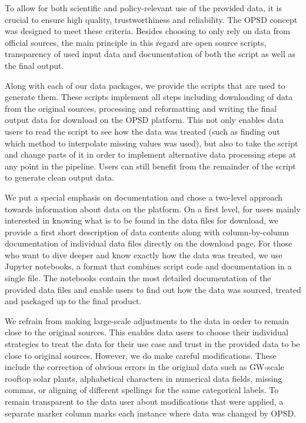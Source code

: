 \documentclass[article,sort&compress]{elsarticle}
\begin{document}
To allow for both scientific and policy-relevant use of the provided data, it is crucial to ensure high quality, trustworthiness and reliability. The OPSD concept was designed to meet these criteria. Besides choosing to only rely on data from official sources, the main principle in this regard are open source scripts, transparency of used input data and documentation of both the script as well as the final output.

Along with each of our data packages, we provide the scripts that are used to generate them. These scripts implement all steps including downloading of data from the original sources, processing and reformatting and writing the final output data for download on the OPSD platform. This not only enables data users to read the script to see how the data was treated (such as finding out which method to interpolate missing values was used), but also to take the script and change parts of it in order to implement alternative data processing steps at any point in the pipeline. Users can still benefit from the remainder of the script to generate clean output data.

We put a special emphasis on documentation and chose a two-level approach towards information about data on the platform. On a first level, for users mainly interested in knowing what is to be found in the data files for download, we provide a first short description of data contents along with column-by-column documentation of individual data files directly on the download page. For those who want to dive deeper and know exactly how the data was treated, we use Jupyter notebooks, a format that combines script code and documentation in a single file. The notebooks contain the most detailed documentation of the provided data files and enable users to find out how the data was sourced, treated and packaged up to the final product.

We refrain from making large-scale adjustments to the data in order to remain close to the original sources. This enables data users to choose their individual strategies to treat the data for their use case and trust in the provided data to be close to original sources. However, we do make careful modifications. These include the correction of obvious errors in the original data such as GW-scale rooftop solar plants, alphabetical characters in numerical data fields, missing commas, or aligning of different spellings for the same categorical labels. To remain transparent to the data user about modifications that were applied, a separate marker column marks each instance where data was changed by OPSD.
\end{document}
